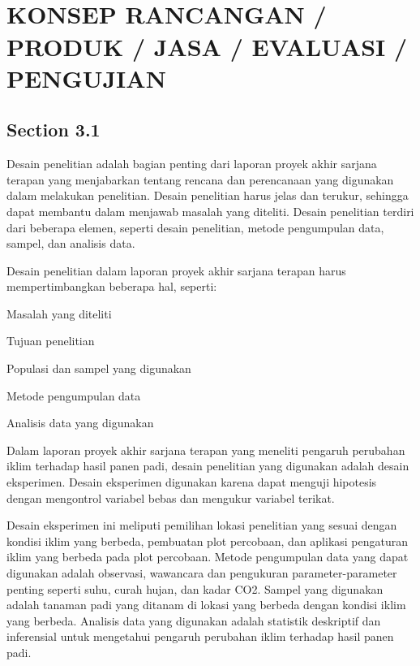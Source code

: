 
\chapter[KONSEP RANCANGAN / PRODUK / JASA / EVALUASI / PENGUJIAN]{\\ KONSEP RANCANGAN / PRODUK / JASA / EVALUASI / PENGUJIAN}

\section{Section 3.1}
Desain penelitian adalah bagian penting dari laporan proyek akhir sarjana terapan yang menjabarkan tentang rencana dan perencanaan yang digunakan dalam melakukan penelitian. Desain penelitian harus jelas dan terukur, sehingga dapat membantu dalam menjawab masalah yang diteliti. Desain penelitian terdiri dari beberapa elemen, seperti desain penelitian, metode pengumpulan data, sampel, dan analisis data.

Desain penelitian dalam laporan proyek akhir sarjana terapan harus mempertimbangkan beberapa hal, seperti:
\begin{packed_item}
    \item Masalah yang diteliti
    \item Tujuan penelitian
    \item Populasi dan sampel yang digunakan
    \item Metode pengumpulan data
    \item Analisis data yang digunakan
\end{packed_item}

Dalam laporan proyek akhir sarjana terapan yang meneliti pengaruh perubahan iklim terhadap hasil panen padi, desain penelitian yang digunakan adalah desain eksperimen. Desain eksperimen digunakan karena dapat menguji hipotesis dengan mengontrol variabel bebas dan mengukur variabel terikat.

Desain eksperimen ini meliputi pemilihan lokasi penelitian yang sesuai dengan kondisi iklim yang berbeda, pembuatan plot percobaan, dan aplikasi pengaturan iklim yang berbeda pada plot percobaan. Metode pengumpulan data yang dapat digunakan adalah observasi, wawancara dan pengukuran parameter-parameter penting seperti suhu, curah hujan, dan kadar CO2. Sampel yang digunakan adalah tanaman padi yang ditanam di lokasi yang berbeda dengan kondisi iklim yang berbeda. Analisis data yang digunakan adalah statistik deskriptif dan inferensial untuk mengetahui pengaruh perubahan iklim terhadap hasil panen padi.

